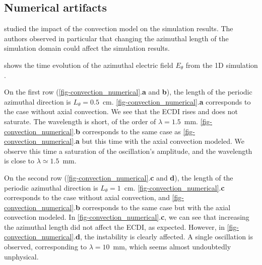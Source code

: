   \subsection{Numerical artifacts}
    \citet{lafleur2016a} studied the impact of the convection model on the simulation results.
    The authors observed in particular that changing the azimuthal length of the simulation domain could affect the simulation results.

     shows the time evolution of the azimuthal electric field $E_{\theta}$ from the \ac{1D} simulation \citep{lafleur2016a}.

    On the first row (\cref{fig-convection_numerical}.{\bf a} and {\bf b}), the length of the periodic azimuthal direction is $L_{\theta}=0.5$~cm.
    \cref{fig-convection_numerical}.{\bf a} corresponds to the case without axial convection.
    We see that the \ac{ECDI} rises and does not saturate.
    The wavelength is short, of the order of $\lambda = 1.5$~mm.
    \cref{fig-convection_numerical}.{\bf b} corresponds to the same case as \cref{fig-convection_numerical}.{\bf a} but this time with the axial convection modeled.
    We observe this time a saturation of the oscillation's amplitude, and the wavelength is close to $\lambda \simeq 1.5$~mm.

    On the second row (\cref{fig-convection_numerical}.{\bf c} and {\bf d}), the length of the periodic azimuthal direction is $L_{\theta}=1$~cm.
    \cref{fig-convection_numerical}.{\bf c} corresponds to the case without axial convection, and \cref{fig-convection_numerical}.{\bf b} corresponds to the same case but with the axial convection modeled.
    In \cref{fig-convection_numerical}.{\bf c}, we can see that increasing the azimuthal length did not affect the \ac{ECDI}, as expected.
    However, in  \cref{fig-convection_numerical}.{\bf d}, the instability is clearly affected.
    A single oscillation is observed, corresponding to $\lambda=10$~mm, which seems almost undoubtedly unphysical.

